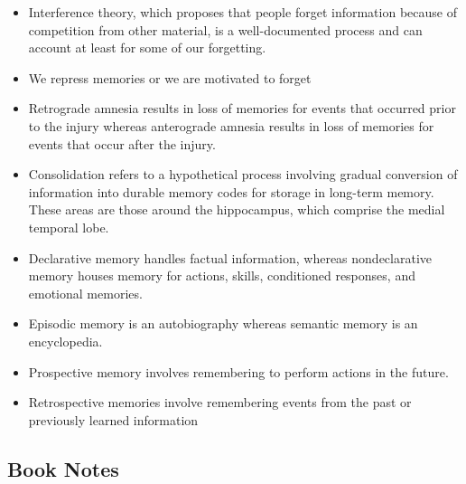 \documentclass{article}
\begin{document}
\begin{itemize}
    \item Interference theory, which proposes that people forget information because of competition from other material, is a well-documented process and can account at least for some of our forgetting.
    \item We repress memories or we are motivated to forget
    \item Retrograde amnesia results in loss of memories for events that occurred prior to the injury whereas anterograde amnesia results in loss of memories for events that occur after the injury.
    \item Consolidation refers to a hypothetical process involving gradual conversion of information into durable memory codes for storage in long-term memory. These areas are those around the hippocampus, which comprise the medial temporal lobe.
    \item Declarative memory handles factual information, whereas nondeclarative memory houses memory for actions, skills, conditioned responses, and emotional memories.
    \item Episodic memory is an autobiography whereas semantic memory is an encyclopedia.
    \item Prospective memory involves remembering to perform actions in the future.
    \item Retrospective memories involve remembering events from the past or previously learned information
\end{itemize}

\subsection{Book Notes}
\end{document}
